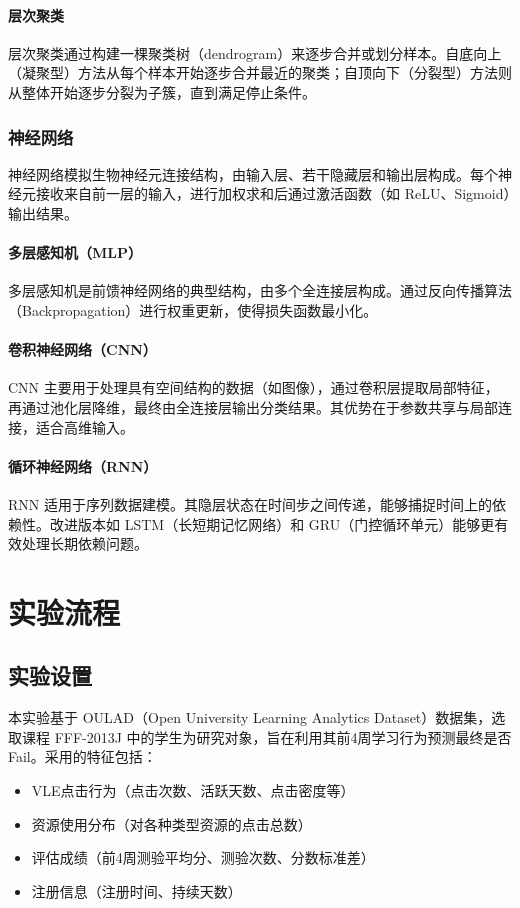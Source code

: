 \documentclass{SYSUReport}
\begin{document}
\paragraph{层次聚类}
层次聚类通过构建一棵聚类树（dendrogram）来逐步合并或划分样本。自底向上（凝聚型）方法从每个样本开始逐步合并最近的聚类；自顶向下（分裂型）方法则从整体开始逐步分裂为子簇，直到满足停止条件。

\subsubsection{神经网络}
神经网络模拟生物神经元连接结构，由输入层、若干隐藏层和输出层构成。每个神经元接收来自前一层的输入，进行加权求和后通过激活函数（如 ReLU、Sigmoid）输出结果。

\paragraph{多层感知机（MLP）}
多层感知机是前馈神经网络的典型结构，由多个全连接层构成。通过反向传播算法（Backpropagation）进行权重更新，使得损失函数最小化。

\paragraph{卷积神经网络（CNN）}
CNN 主要用于处理具有空间结构的数据（如图像），通过卷积层提取局部特征，再通过池化层降维，最终由全连接层输出分类结果。其优势在于参数共享与局部连接，适合高维输入。

\paragraph{循环神经网络（RNN）}
RNN 适用于序列数据建模。其隐层状态在时间步之间传递，能够捕捉时间上的依赖性。改进版本如 LSTM（长短期记忆网络）和 GRU（门控循环单元）能够更有效处理长期依赖问题。


\section{实验流程}


\subsection{实验设置}
本实验基于 OULAD（Open University Learning Analytics Dataset）数据集，选取课程 FFF-2013J 中的学生为研究对象，旨在利用其前4周学习行为预测最终是否Fail。采用的特征包括：
\begin{itemize}
    \item VLE点击行为（点击次数、活跃天数、点击密度等）
    \item 资源使用分布（对各种类型资源的点击总数）
    \item 评估成绩（前4周测验平均分、测验次数、分数标准差）
    \item 注册信息（注册时间、持续天数）
\end{itemize}
\end{document}
